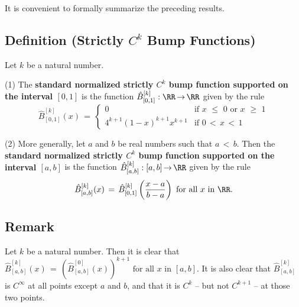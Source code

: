 {\V

        It is convenient to formally summarize the preceding results.

\V

            \subsection{\small{\bf Definition} (Strictly $C^{k}$ Bump Functions)}
            \label{DefE35.110}

\V

        Let $k$ be a natural number.

\V

        (1) The {\bf standard normalized strictly $C^{k}$ bump function supported on the interval $[0,1]$}
    is the function $\hat{B}^{[k]}_{[0,1]}:{\RR} \,{\rightarrow}\, {\RR}$ given by the rule
        \begin{displaymath}
        \hat{B}^{[k]}_{[0,1]}(x) \,=\, 
            \left\{
        \begin{array}{cl}
              0        & \mbox{if $x\,\,{\leq}\,\,0$ or $x\,\,{\geq}\,\,1$} \\
    4^{k+1}(1-x)^{k+1}x^{k+1} & \mbox{if $0\,<\,x\,<\,1$}
        \end{array}
                        \right.
        \end{displaymath}


\V

        (2) More generally, let $a$ and $b$ be real numbers such that $a\,<\,b$. 
    Then the {\bf standard normalized strictly $C^{k}$ bump function supported on the interval $[a,b]$} is the function $\hat{B}^{[k]}_{[a,b]}:[a,b] \,{\rightarrow}\, {\RR}$ given by the rule
        \begin{displaymath}
        \hat{B}^{[k]}_{[a,b]}(x) \,=\, \hat{B}^{[k]}_{[0,1]}\left(\frac{x-a}{b-a}\right) \mbox{ for all $x$ in ${\RR}$}.
        \end{displaymath}

\V

            \subsection{\small{\bf Remark}}
            \label{RemrkE35.115}

        Let $k$ be a natural number. Then it is clear that 
    $\hat{B}^{[k]}_{[a,b]}(x) \,=\, \left(\hat{B}^{[0]}_{[a,b]}(x)\right)^{k+1} \mbox{ for all $x$ in $[a,b]$}$.
    It is also clear that $\hat{B}^{[k]}_{[a,b]}$ is $C^{{\infty}}$ at all points except $a$ and $b$,
    and that it is $C^{k}$ -- but not $C^{k+1}$ -- at those two points.

}

